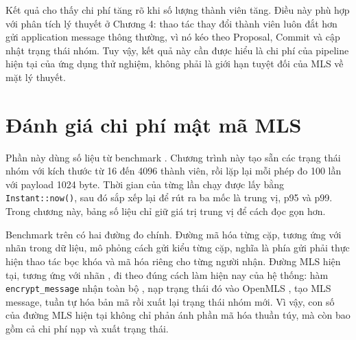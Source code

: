 \documentclass[../DoAn.tex]{subfiles}
\begin{document}
Kết quả cho thấy chi phí tăng rõ khi số lượng thành viên tăng. Điều này phù hợp với phân tích lý thuyết ở Chương 4: thao tác thay đổi thành viên luôn đắt hơn gửi application message thông thường, vì nó kéo theo Proposal, Commit và cập nhật trạng thái nhóm. Tuy vậy, kết quả này cần được hiểu là chi phí của pipeline hiện tại của ứng dụng thử nghiệm, không phải là giới hạn tuyệt đối của MLS về mặt lý thuyết.
	
\section{Đánh giá chi phí mật mã MLS}
\label{sec:danh_gia_crypto}
	
Phần này dùng số liệu từ benchmark . Chương trình này tạo sẵn các trạng thái nhóm với kích thước từ 16 đến 4096 thành viên, rồi lặp lại mỗi phép đo 100 lần với payload 1024 byte. Thời gian của từng lần chạy được lấy bằng \texttt{Instant::now()}, sau đó sắp xếp lại để rút ra ba mốc là trung vị, p95 và p99. Trong chương này, bảng số liệu chỉ giữ giá trị trung vị để cách đọc gọn hơn.

Benchmark trên có hai đường đo chính. Đường mã hóa từng cặp, tương ứng với nhãn  trong dữ liệu, mô phỏng cách gửi kiểu từng cặp, nghĩa là phía gửi phải thực hiện thao tác bọc khóa và mã hóa riêng cho từng người nhận. Đường MLS hiện tại, tương ứng với nhãn , đi theo đúng cách làm hiện nay của hệ thống: hàm \texttt{encrypt\_message} nhận toàn bộ , nạp trạng thái đó vào OpenMLS \cite{openmls2026doc}, tạo MLS message, tuần tự hóa bản mã rồi xuất lại trạng thái nhóm mới. Vì vậy, con số của đường MLS hiện tại không chỉ phản ánh phần mã hóa thuần túy, mà còn bao gồm cả chi phí nạp và xuất trạng thái.
	
	\begin{table}[htbp]
		\centering
		\caption{So sánh trung vị thời gian xử lý giữa hai hướng mã hóa, với payload 1024 byte và 100 mẫu cho mỗi điểm đo}
		\label{tab:mls_crypto_benchmark}
\end{table}
\end{document}
